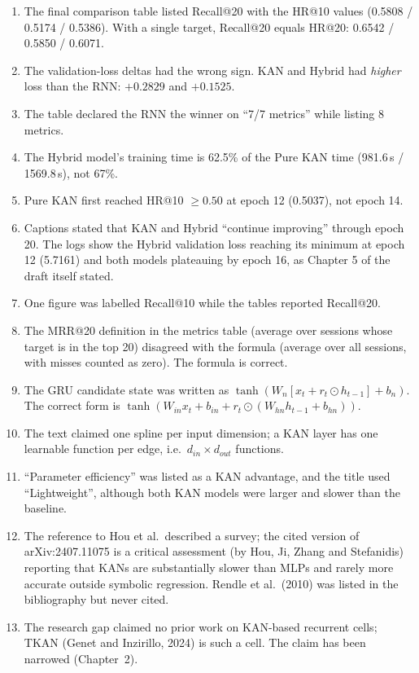 \documentclass[12pt,a4paper]{report}
\begin{document}
\begin{enumerate}[leftmargin=*]
  \item The final comparison table listed Recall@20 with the HR@10 values
        (0.5808 / 0.5174 / 0.5386). With a single target, Recall@20 equals
        HR@20: 0.6542 / 0.5850 / 0.6071.
  \item The validation-loss deltas had the wrong sign. KAN and Hybrid had
        \emph{higher} loss than the RNN: $+0.2829$ and $+0.1525$.
  \item The table declared the RNN the winner on ``7/7 metrics'' while listing
        8 metrics.
  \item The Hybrid model's training time is 62.5\% of the Pure KAN time
        (981.6\,s / 1569.8\,s), not 67\%.
  \item Pure KAN first reached HR@10 $\geq 0.50$ at epoch 12 (0.5037), not
        epoch 14.
  \item Captions stated that KAN and Hybrid ``continue improving'' through
        epoch 20. The logs show the Hybrid validation loss reaching its minimum
        at epoch 12 (5.7161) and both models plateauing by epoch 16, as
        Chapter 5 of the draft itself stated.
  \item One figure was labelled Recall@10 while the tables reported Recall@20.
  \item The MRR@20 definition in the metrics table (average over sessions whose
        target is in the top 20) disagreed with the formula (average over all
        sessions, with misses counted as zero). The formula is correct.
  \item The GRU candidate state was written as
        $\tanh(W_n[x_t + r_t\odot h_{t-1}] + b_n)$. The correct form is
        $\tanh(W_{in}x_t + b_{in} + r_t\odot(W_{hn}h_{t-1} + b_{hn}))$.
  \item The text claimed one spline per input dimension; a KAN layer has one
        learnable function per edge, i.e.\ $d_{in}\times d_{out}$ functions.
  \item ``Parameter efficiency'' was listed as a KAN advantage, and the title
        used ``Lightweight'', although both KAN models were larger and slower
        than the baseline.
  \item The reference to Hou et al.\ described a survey; the cited version of
        arXiv:2407.11075 is a critical assessment (by Hou, Ji, Zhang and
        Stefanidis) reporting that KANs are substantially slower than MLPs and
        rarely more accurate outside symbolic regression. Rendle et al.\ (2010)
        was listed in the bibliography but never cited.
  \item The research gap claimed no prior work on KAN-based recurrent cells;
        TKAN (Genet and Inzirillo, 2024) is such a cell. The claim has been
        narrowed (Chapter~2).
\end{enumerate}
\end{document}

